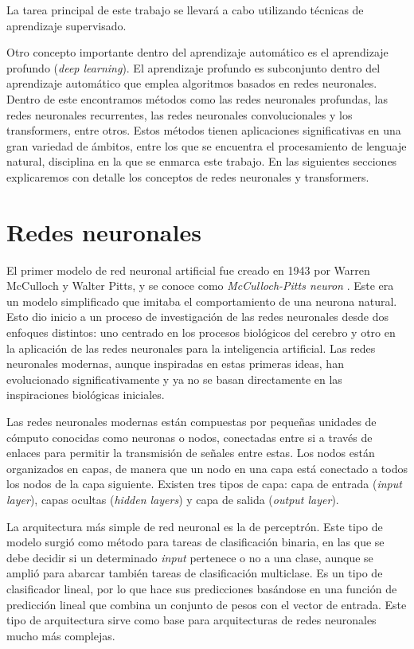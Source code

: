\documentclass[11pt,spanish,listoffigures,listoftables]{tfgetsinf}
\begin{document}
La tarea principal de este trabajo se llevará a cabo utilizando técnicas de aprendizaje supervisado.

Otro concepto importante dentro del aprendizaje automático es el aprendizaje profundo (\textit{deep learning}). El aprendizaje profundo es subconjunto dentro del aprendizaje automático que emplea algoritmos basados en redes neuronales. Dentro de este encontramos métodos como las redes neuronales profundas, las redes neuronales recurrentes, las redes neuronales convolucionales y los transformers, entre otros. Estos métodos tienen aplicaciones significativas en una gran variedad de ámbitos, entre los que se encuentra el procesamiento de lenguaje natural, disciplina en la que se enmarca este trabajo. En las siguientes secciones explicaremos con detalle los conceptos de redes neuronales y transformers.

\section{Redes neuronales}

El primer modelo de red neuronal artificial fue creado en 1943 por Warren McCulloch y Walter Pitts, y se conoce como \textit{McCulloch-Pitts neuron} \cite{mcculloch1943logical}. Este era un modelo simplificado que imitaba el comportamiento de una neurona natural. Esto dio inicio a un proceso de investigación de las redes neuronales desde dos enfoques distintos: uno centrado en los procesos biológicos del cerebro y otro en la aplicación de las redes neuronales para la inteligencia artificial. Las redes neuronales modernas, aunque inspiradas en estas primeras ideas, han evolucionado significativamente y ya no se basan directamente en las inspiraciones biológicas iniciales.

Las redes neuronales modernas están compuestas por pequeñas unidades de cómputo conocidas como neuronas o nodos, conectadas entre si a través de enlaces para permitir la transmisión de señales entre estas. Los nodos están organizados en capas, de manera que un nodo en una capa está conectado a todos los nodos de la capa siguiente. Existen tres tipos de capa: capa de entrada (\textit{input layer}), capas ocultas (\textit{hidden layers}) y capa de salida (\textit{output layer}). 

La arquitectura más simple de red neuronal es la de perceptrón. Este tipo de modelo surgió como método para tareas de clasificación binaria, en las que se debe decidir si un determinado \textit{input} pertenece o no a una clase, aunque se amplió para abarcar también tareas de clasificación multiclase. Es un tipo de clasificador lineal, por lo que hace sus predicciones basándose en una función de predicción lineal que combina un conjunto de pesos con el vector de entrada. Este tipo de arquitectura sirve como base para arquitecturas de redes neuronales mucho más complejas.
\end{document}
